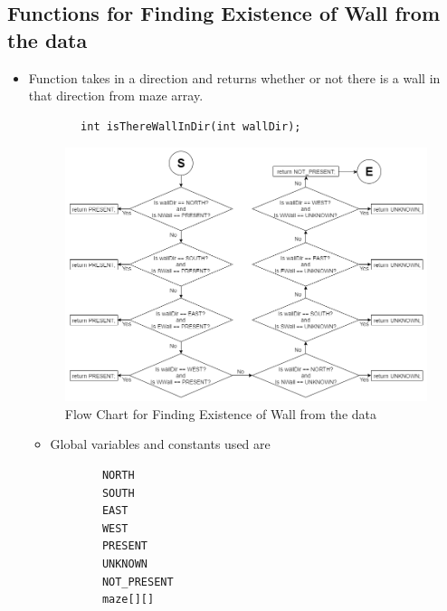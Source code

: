 \documentclass[11pt]{article}
\begin{document}
\newpage


\subsection{Functions for Finding Existence of Wall from the data}
\begin{itemize}
\item Function takes in a direction and returns whether or not there is a wall in that direction from maze array.
	\begin{verbatim}
		int isThereWallInDir(int wallDir);
	\end{verbatim}
\begin{figure}[htp]
\centering
\includegraphics[scale=0.580]{images/Software_Flowchart/isThereWallInDir.png}
\caption{Flow Chart for Finding Existence of Wall from the data}
\label{}
\end{figure}
	\begin{itemize}
	\item Global variables and constants used are
	\begin{verbatim}
		NORTH
		SOUTH
		EAST
		WEST
		PRESENT
		UNKNOWN
		NOT_PRESENT
		maze[][]
	\end{verbatim}
	\end{itemize}
\end{itemize}
\newpage

\end{document}
